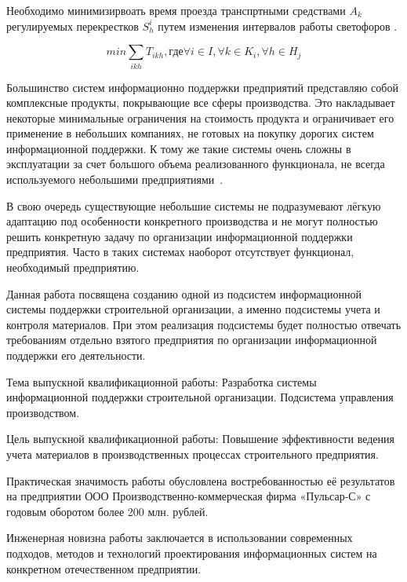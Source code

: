 \documentclass[a4paper,13pt]{article}
\begin{document}
Необходимо минимизирвоать время проезда транспртными средствами \begin{math}A_k\end{math} регулируемых перекрестков \begin{math}S^i_{h}\end{math} путем изменения интервалов работы светофоров .

\begin{equation}\label{eq:crosstime}
min \sum_{ikh} T_{ikh}, \text{где} \forall i \in I, \forall k \in K_i, \forall h \in H_j
\end{equation}

Большинство систем информационно поддержки предприятий представляю собой комплексные продукты, покрывающие все сферы производства. Это накладывает некоторые минимальные ограничения на стоимость продукта и ограничивает его применение в небольших компаниях, не готовых на покупку дорогих систем информационной поддержки. К тому же такие системы очень сложны в эксплуатации за счет большого объема реализованного функционала, не всегда используемого небольшими предприятиями~\cite{pb}.

В свою очередь существующие небольшие системы не подразумевают лёгкую адаптацию под особенности конкретного производства и не могут полностью решить конкретную задачу по организации информационной поддержки предприятия. Часто в таких системах наоборот  отсутствует функционал, необходимый предприятию.

Данная работа посвящена созданию одной из подсистем информационной системы поддержки строительной организации, а именно подсистемы учета и контроля материалов. При этом реализация подсистемы будет полностью отвечать требованиям отдельно взятого предприятия по организации информационной поддержки его деятельности.

Тема выпускной квалификационной работы:  Разработка системы информационной поддержки строительной организации. Подсистема управления производством.

Цель выпускной квалификационной работы: Повышение эффективности ведения учета материалов в производственных процессах строительного предприятия. 

Практическая значимость работы обусловлена востребованностью её результатов на предприятии ООО Производственно-коммерческая фирма «Пульсар-С» с годовым оборотом более 200 млн. рублей.

Инженерная новизна работы заключается в использовании современных подходов, методов и технологий проектирования информационных систем на конкретном отечественном предприятии.
\end{document}
